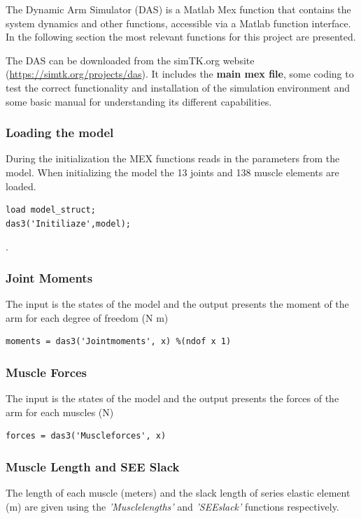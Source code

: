 The Dynamic Arm Simulator (DAS) is a Matlab Mex function that contains the system dynamics and other functions, accessible via a Matlab function interface. In the following section the most relevant functions for this project are presented. 

The DAS can be downloaded from the simTK.org website (\href{https://simtk.org/projects/das}{https://simtk.org/projects/das}). It includes the \textbf{main mex file}, some coding to test the correct functionality and installation of the simulation environment and some basic manual for understanding its different capabilities. 
\subsubsection{Loading the model}

During the initialization the MEX functions reads in the parameters from the model. When initializing the model the 13 joints and 138 muscle elements are loaded.


\begin{lstlisting}
load model_struct;
das3('Initiliaze',model);
\end{lstlisting}
.

\subsubsection{Joint Moments}
The input is the states of the model and the output presents the moment of the arm for each degree of freedom (N m)
\begin{lstlisting}
moments = das3('Jointmoments', x) %(ndof x 1)
\end{lstlisting}

\subsubsection{Muscle Forces}
The input is the states of the model and the output presents the forces of the arm for each muscles (N)
\begin{lstlisting}
forces = das3('Muscleforces', x)
\end{lstlisting}

\subsubsection{Muscle Length and SEE Slack}
The length of each muscle (meters) and the slack length of series elastic element (m) are given using the \textit{'Musclelengths'} and \textit{'SEEslack'} functions respectively. 

